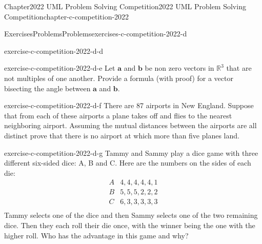 \documentclass[oneside,10pt,]{book}
\numberwithin{equation}{section}
\providecommand\phantomsection{}
\newcommand{\RR}{\mathbb{R}}
\renewcommand{\vec}[1]{\mathbf{#1}}
\begin{document}
\begin{chapterptx}{Chapter}{2022 UML Problem Solving Competition}{}{2022 UML Problem Solving Competition}{}{}{chapter-c-competition-2022}
\begin{exercises-section}{Exercises}{Problems}{}{Problems}{}{}{exercises-c-competition-2022-d}
\begin{divisionexercise}{3}{}{}{exercise-c-competition-2022-d-d}
\end{divisionexercise}%
\begin{divisionexercise}{4}{}{}{exercise-c-competition-2022-d-e}%
Let \(\vec{a}\) and  \(\vec{b}\)  be non zero vectors in \(\RR^3\) that are not multiples of one another. Provide a formula (with proof) for a vector bisecting the angle between \(\vec{a}\) and \(\vec{b}\).%
\end{divisionexercise}%
\begin{divisionexercise}{5}{}{}{exercise-c-competition-2022-d-f}%
There are 87 airports in New England. Suppose that from each of these airports a plane takes off and flies to the nearest neighboring airport. Assuming the mutual distances between the airports are all distinct prove that there is no airport at which more than five planes land.%
\end{divisionexercise}%
\begin{divisionexercise}{6}{}{}{exercise-c-competition-2022-d-g}%
Tammy and Sammy play a dice game with three different six-sided dice: A, B and C. Here are the numbers on the sides of each die:%
\begin{equation*}
\begin{array}{cc}
A & 4, 4, 4, 4, 4, 1 \\
B & 5, 5, 5, 2, 2, 2 \\
C & 6, 3, 3, 3, 3, 3 \\
\end{array}
\end{equation*}
Tammy selects one of the dice and then Sammy selects one of the two remaining dice.  Then they each roll their die once, with the winner being the one with the higher roll.   Who has the advantage in this game and why?%
\end{divisionexercise}%
\end{exercises-section}
\end{chapterptx}
%
\appendix%
%
\clearpage\phantomsection%
%
%
%
\typeout{************************************************}
\typeout{************************************************}
%
\end{document}

